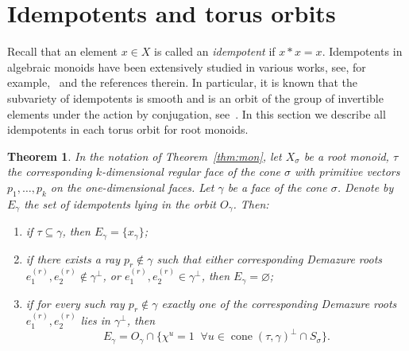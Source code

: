 \documentclass[a4paper, 11pt]{amsart}
\theoremstyle{plain}
\newtheorem{theorem}{Theorem}[section]
\theoremstyle{remark}
\theoremstyle{definition}
\DeclareMathOperator{\cone}{cone}
\begin{document}
\section{Idempotents and torus orbits}\label{sec:idemp} 

Recall that an element $x \in X$ is called an \textit{idempotent} if $x * x = x$. Idempotents in algebraic monoids have been extensively studied in various works, see, for example,~\cite{Br-1, Br-2, Neeb, Re} and the references therein. In particular, it is known that the subvariety of idempotents is smooth and is an orbit of the group of invertible elements under the action by conjugation, see~\cite[Theorem~1.1]{Br-2}. In this section we describe all idempotents in each torus orbit for root monoids. 

\begin{theorem}\label{idem_thm_1}
	In the notation of Theorem~\ref{thm:mon}, let $X_\sigma$ be a root monoid, $\tau$ the corresponding $k$-dimensional regular face of the cone $\sigma$ with primitive vectors $p_1, \ldots, p_k$ on the one-dimensional faces. Let $\gamma$ be a face of the cone $\sigma$. Denote by $E_\gamma$ the set of idempotents lying in the orbit $O_\gamma$. Then:
	\begin{enumerate}
		\item if $\tau \subseteq \gamma$, then $E_\gamma = \{x_\gamma \}$; 
		\item if there exists a ray $p_r \notin \gamma$ such that either corresponding Demazure roots $e_1^{(r)}, e_2^{(r)} \notin \gamma^\perp$, or $e_1^{(r)}, e_2^{(r)} \in \gamma^\perp$, then $E_\gamma = \varnothing$;
		\item if for every such ray $p_r \notin \gamma$ exactly one of the corresponding Demazure roots $e_1^{(r)}, e_2^{(r)}$ lies in $\gamma^\perp$, then \[E_\gamma = O_\gamma \cap \{\chi^u = 1\;\; \forall u \in \cone(\tau, \gamma)^\perp \cap S_\sigma\}.\]
	\end{enumerate}
\end{theorem}
\end{document}
